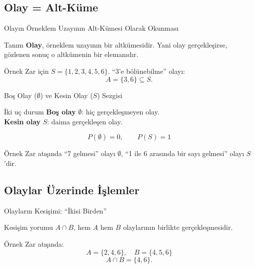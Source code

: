 \documentclass[light]{lutbeamer}
\begin{document}
\subsection{Olay = Alt-Küme}
\begin{frame}{Olayın Örneklem Uzayının Alt-Kümesi Olarak Okunması}
    \begin{block}{Tanım}
        \textbf{Olay}, örneklem uzayının bir altkümesidir.
        Yani olay gerçekleşirse, gözlenen sonuç o altkümenin bir elemanıdır.
    \end{block}

    \begin{exampleblock}{Örnek}
        Zar için $S=\{1,2,3,4,5,6\}$.
        ``3'e bölünebilme'' olayı:
        \[
            A=\{3,6\}\subseteq S.
        \]
    \end{exampleblock}
\end{frame}

\begin{frame}[fragile]{Boş Olay ($\emptyset$) ve Kesin Olay ($S$) Sezgisi}
    \begin{block}{İki uç durum}
        \textbf{Boş olay} $\emptyset$: hiç gerçekleşmeyen olay. \\
        \textbf{Kesin olay} $S$: daima gerçekleşen olay.
    \end{block}

    \[
        P(\emptyset)=0, \qquad P(S)=1
    \]

    \begin{exampleblock}{Örnek}
        Zar atışında ``7 gelmesi'' olayı $\emptyset$, 
        ``1 ile 6 arasında bir sayı gelmesi'' olayı $S$'dir.
    \end{exampleblock}
\end{frame}

\subsection{Olaylar Üzerinde İşlemler}
\begin{frame}{Olayların Kesişimi: ``İkisi Birden''}
    \begin{block}{Kesişim yorumu}
        $A\cap B$, hem $A$ hem $B$ olaylarının birlikte gerçekleşmesidir.
    \end{block}

    \begin{exampleblock}{Örnek}
        Zar atışında:
        \[
            A=\{2,4,6\},\quad B=\{4,5,6\}
        \]
        \[
            A\cap B=\{4,6\}.
        \]
    \end{exampleblock}
\end{frame}
\end{document}
